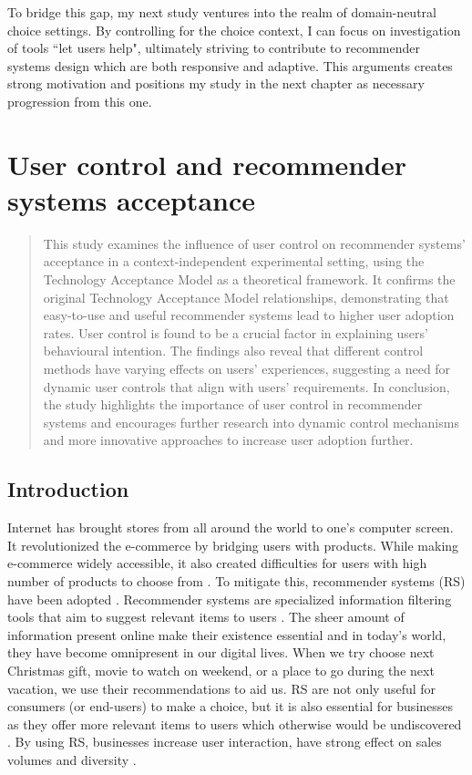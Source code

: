 \documentclass[a4paper,12pt]{article}
\begin{document}
To bridge this gap, my next study ventures into the realm of domain-neutral choice settings. By controlling for the choice context, I can focus on investigation of tools ``let users help", ultimately striving to contribute to recommender systems design which are both responsive and adaptive. This arguments creates strong motivation and positions my study in the next chapter as necessary progression from this one.


\newpage


\section{User control and recommender systems acceptance}\label{chapter:UserControlAndRS}
\begin{abstract}

    This study examines the influence of user control on recommender systems' acceptance in a context-independent experimental setting, using the Technology Acceptance Model as a theoretical framework. It confirms the original  Technology Acceptance Model relationships, demonstrating that easy-to-use and useful recommender systems lead to higher user adoption rates. User control is found to be a crucial factor in explaining users' behavioural  intention. The findings also reveal that different control methods have varying effects on users' experiences, suggesting a need for dynamic user controls that align with users' requirements. In conclusion, the study highlights the importance of user control in recommender systems and encourages further research into dynamic control mechanisms and more innovative approaches to increase user adoption further.
    
\end{abstract}

\subsection{Introduction}

Internet has brought stores from all around the world to one's computer screen. It revolutionized the e-commerce by bridging users with products. While making e-commerce widely accessible, it also created difficulties for users with high number of products to choose from \citep{ricci2011introduction}. To mitigate this, recommender systems (RS) have been adopted \citep{kotkovSurveySerendipityRecommender2016}. Recommender systems are specialized information filtering tools that aim to suggest relevant items to users \citep{adomavicius2005toward}. The sheer amount of information present online make their existence essential and in today's  world, they have become omnipresent in our digital lives. When we try choose next Christmas gift, movie to watch on weekend, or a place to go during the next vacation, we use their recommendations to aid us. RS are not only useful for consumers (or end-users) to make a choice, but it is also essential for businesses as they offer more relevant items to users which otherwise would be undiscovered \citep{ricci2011introduction}. By using RS, businesses increase user interaction, have strong effect on sales volumes and diversity \citep{songWhenHowDiversify2019}.
\end{document}
